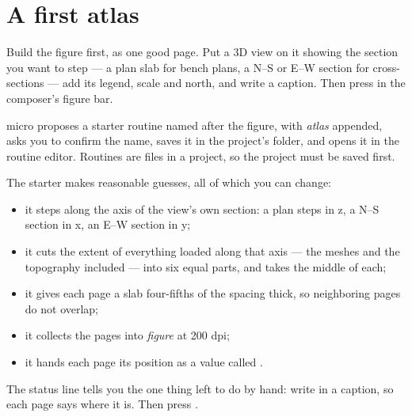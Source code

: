 \section{A first atlas}\label{sec:atlas-first}

Build the figure first, as one good page. Put a 3D view on it showing the section you want to step — a plan slab for bench plans, a N–S or E–W section for cross-sections — add its legend, scale and north, and write a caption. Then press  in the composer's figure bar.

micro proposes a starter routine named after the figure, with \emph{atlas} appended, asks you to confirm the name, saves it in the project's  folder, and opens it in the routine editor. Routines are files in a project, so the project must be saved first.

The starter makes reasonable guesses, all of which you can change:

\begin{itemize}
\item it steps along the axis of the view's own section: a plan steps in z, a N–S section in x, an E–W section in y;
\item it cuts the extent of everything loaded along that axis — the meshes and the topography included — into six equal parts, and takes the middle of each;
\item it gives each page a slab four-fifths of the spacing thick, so neighboring pages do not overlap;
\item it collects the pages into \emph{figure} at 200 dpi;
\item it hands each page its position as a value called .
\end{itemize}

The status line tells you the one thing left to do by hand: write  in a caption, so each page says where it is. Then press .

